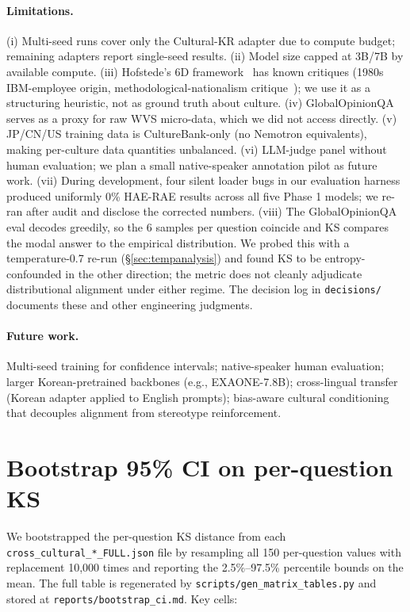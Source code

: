 \documentclass{article}
\begin{document}
\paragraph{Limitations.}
(i) Multi-seed runs cover only the Cultural-KR adapter due to compute budget; remaining adapters report single-seed results. (ii) Model size capped at 3B/7B by available compute. (iii) Hofstede's 6D framework~\cite{hofstede2010cultures} has known critiques (1980s IBM-employee origin, methodological-nationalism critique~\cite{mcsweeney2002}); we use it as a structuring heuristic, not as ground truth about culture. (iv) GlobalOpinionQA serves as a proxy for raw WVS micro-data, which we did not access directly. (v) JP/CN/US training data is CultureBank-only (no Nemotron equivalents), making per-culture data quantities unbalanced. (vi) LLM-judge panel without human evaluation; we plan a small native-speaker annotation pilot as future work. (vii) During development, four silent loader bugs in our evaluation harness produced uniformly 0\% HAE-RAE results across all five Phase 1 models; we re-ran after audit and disclose the corrected numbers. (viii) The GlobalOpinionQA eval decodes greedily, so the 6 samples per question coincide and KS compares the modal answer to the empirical distribution. We probed this with a temperature-0.7 re-run (\S\ref{sec:tempanalysis}) and found KS to be entropy-confounded in the other direction; the metric does not cleanly adjudicate distributional alignment under either regime. The decision log in \verb|decisions/| documents these and other engineering judgments.

\paragraph{Future work.}
Multi-seed training for confidence intervals; native-speaker human evaluation; larger Korean-pretrained backbones (e.g., EXAONE-7.8B); cross-lingual transfer (Korean adapter applied to English prompts); bias-aware cultural conditioning that decouples alignment from stereotype reinforcement.




\newpage
\appendix

\section{Bootstrap 95\% CI on per-question KS}
\label{app:bootstrap}

We bootstrapped the per-question KS distance from each
\verb|cross_cultural_*_FULL.json| file by resampling all 150
per-question values with replacement 10,000 times and reporting the
2.5\%--97.5\% percentile bounds on the mean. The full table is
regenerated by \verb|scripts/gen_matrix_tables.py| and stored at
\verb|reports/bootstrap_ci.md|. Key cells:
\end{document}
